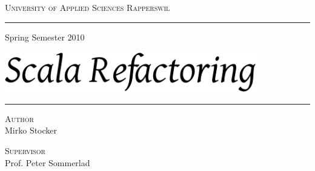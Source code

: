 \begin{titlepage}
 
\enlargethispage{4cm}

\begin{center}
 
\textsc{\Large University of Applied Sciences Rapperswil}
 
\textsc{\subtitlename}

\rule{0.83\textwidth}{0.4pt}

\vspace{0.2cm}

\normalsize{Spring Semester 2010}

\vspace*{\fill}

\begin{center}
  \includegraphics[width=0.83\textwidth]{title_gentium.pdf}
\end{center}

\vspace*{\fill}
\vspace{\baselineskip}

\normalsize{}

\rule{0.83\textwidth}{0.4pt}
\vskip0.35cm
\begin{minipage}{0.4\textwidth}
\begin{flushleft} \large
\textsc{Author}\\
Mirko Stocker
\end{flushleft}
\end{minipage}
\begin{minipage}{0.4\textwidth}
\begin{flushright} \large
\textsc{Supervisor} \\
Prof. Peter Sommerlad
\end{flushright}
\end{minipage}
 
\end{center}
 
\end{titlepage}
